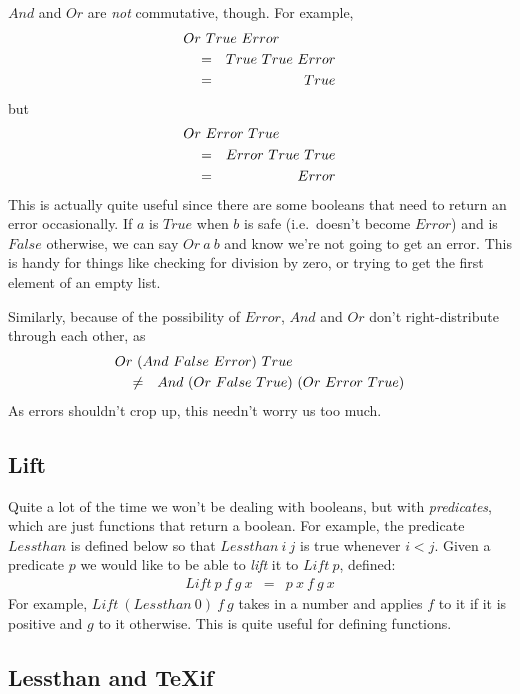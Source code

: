 $And$ and $Or$ are {\em not\/} commutative, though.  For example,
\begin{eqnarray*}
   \start{Or~True~Error}  
   &  =  &  True~True~Error  \\
   &  =  &  True
\end{eqnarray*}
but
\begin{eqnarray*}
   \start{Or~Error~True}  
   &  =  &  Error~True~True \\
   &  =  &  Error
\end{eqnarray*}
This is actually quite useful since there are some booleans that
need to return an error occasionally.  If $a$ is $True$ when $b$ 
is safe (i.e.\ doesn't become $Error$) and is $False$ otherwise, we can
say $Or~a~b$ and know we're not going to get an error.  This is handy
for things like checking for division by zero, or trying to get the
first element of an empty list.

Similarly, because of the possibility of $Error$,
$And$ and $Or$ don't right-distribute through each other,
as
\begin{eqnarray*}
   \start{Or~(And~False~Error)~True}
   &  \ne  &  And~(Or~False~True)~(Or~Error~True)
\end{eqnarray*}
As errors shouldn't crop up, this needn't worry us too much.
\begin{TeXcode}
\def\And#1#2{#1{#2}\False}
\def\Or#1#2{#1\True{#2}}
\end{TeXcode}

\subsection{Lift}

Quite a lot of the time we won't be dealing with booleans, but with
{\em predicates}, which are just functions that return a boolean.
For example, the predicate $Lessthan$ is defined below so that
$Lessthan~i~j$ is true whenever $i<j$.
Given a predicate $p$ we would like to be able to 
{\em lift\/} it to $Lift~p$, defined:
\begin{eqnarray*}
   Lift~p~f~g~x  &  =  &  p~x~f~g~x
\end{eqnarray*}
For example, $Lift~(Lessthan~0)~f~g$ takes in a number and applies
$f$ to it if it is positive and $g$ to it otherwise.  This is quite
useful for defining functions.
\begin{TeXcode}
\def\Lift#1#2#3#4{#1{#4}{#2}{#3}{#4}}
\end{TeXcode}

\subsection{Lessthan and \TeX if}


